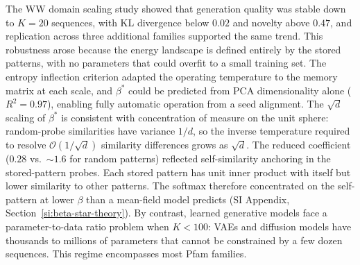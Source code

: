 The WW domain scaling study showed that generation quality was stable down to $K{=}20$ sequences, with KL divergence below $0.02$ and novelty above $0.47$, and replication across three additional families supported the same trend. This robustness arose because the energy landscape is defined entirely by the stored patterns, with no parameters that could overfit to a small training set. The entropy inflection criterion adapted the operating temperature to the memory matrix at each scale, and $\beta^*$ could be predicted from PCA dimensionality alone ($R^2{=}0.97$), enabling fully automatic operation from a seed alignment. The $\sqrt{d}$ scaling of $\beta^*$ is consistent with concentration of measure on the unit sphere: random-probe similarities have variance $1/d$, so the inverse temperature required to resolve $\mathcal{O}(1/\sqrt{d})$ similarity differences grows as $\sqrt{d}$. The reduced coefficient ($0.28$ vs.\ ${\sim}1.6$ for random patterns) reflected self-similarity anchoring in the stored-pattern probes. Each stored pattern has unit inner product with itself but lower similarity to other patterns. The softmax therefore concentrated on the self-pattern at lower $\beta$ than a mean-field model predicts (SI Appendix, Section~\ref{si:beta-star-theory}). By contrast, learned generative models face a parameter-to-data ratio problem when $K < 100$: VAEs and diffusion models have thousands to millions of parameters that cannot be constrained by a few dozen sequences. This regime encompasses most Pfam families.

